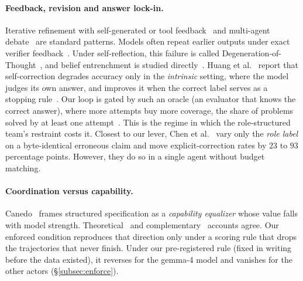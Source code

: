 \paragraph{Feedback, revision and answer lock-in.} Iterative refinement with
self-generated or tool
feedback~\cite{madaan2023selfrefine,shinn2023reflexion,gou2024critic} and
multi-agent debate~\cite{du2024debate,liang2024divergent} are standard
patterns. Models often repeat earlier outputs under exact verifier
feedback~\cite{jiang2026exactfeedback}. Under self-reflection, this failure
is called Degeneration-of-Thought~\cite{liang2024divergent}, and belief
entrenchment is studied directly~\cite{oh2026entrenchment}. Huang et
al.~\cite{huang2024selfcorrect} report that self-correction degrades
accuracy only in the \emph{intrinsic} setting, where the model judges its
own answer, and improves it when the correct label serves as a stopping
rule~\cite[see also][]{stechly2024selfverification,kamoi2024when}. Our loop
is gated by such an oracle (an evaluator that knows the correct answer),
where more attempts buy more coverage, the share of problems solved by at
least one attempt~\cite{brown2024monkeys}. This is the regime in which the
role-structured team's restraint costs it. Closest to our lever, Chen et
al.~\cite{chen2026relabeling} vary only the \emph{role label} on a
byte-identical erroneous claim and move explicit-correction rates by $23$ to
$93$ percentage points. However, they do so in a single agent without budget
matching.

\paragraph{Coordination versus capability.}
Canedo~\cite{canedo2026architecture} frames structured specification as a
\emph{capability equalizer} whose value falls with model strength.
Theoretical~\cite{yu2026bottleneck} and
complementary~\cite{dochkina2026drop} accounts agree. Our enforced condition
reproduces that direction only under a scoring rule that drops the
trajectories that never finish. Under our pre-registered rule (fixed in
writing before the data existed), it reverses for the gemma-4 model and
vanishes for the other actors (\S\ref{subsec:enforce}).

